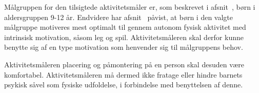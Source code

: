  

Målgruppen for den tilsigtede aktivitetsmåler er, som beskrevet i afsnit~, børn i aldersgruppen 9-12 år. Endvidere har afsnit~ påvist, at børn i den valgte målgruppe motiveres mest optimalt til  gennem autonom fysisk aktivitet med intrinsisk motivation, såsom leg og spil. Aktivitetsmåleren skal derfor kunne benytte sig af en type motivation som henvender sig til målgruppens behov. \newline

Aktivitetsmåleren placering og påmontering på en person skal desuden være komfortabel. Aktivitetsmåleren må dermed ikke fratage eller hindre barnets psykisk såvel som fysiske udfoldelse, i forbindelse med benyttelsen af denne. 


